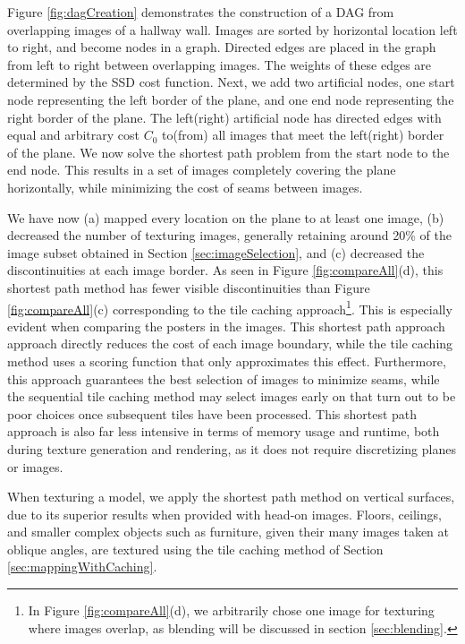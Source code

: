 \documentclass[]{spie}  %
\begin{document}
Figure \ref{fig:dagCreation} demonstrates the construction of a DAG
from overlapping images of a hallway wall. Images are sorted by
horizontal location left to right, and become nodes in a
graph. Directed edges are placed in the graph from left to right
between overlapping images. The weights of these edges are determined
by the SSD cost function. Next, we add two artificial nodes, one start
node representing the left border of the plane, and one end node
representing the right border of the plane. The left(right) artificial
node has directed edges with equal and arbitrary cost $C_0$ to(from)
all images that meet the left(right) border of the plane. We now solve
the shortest path problem from the start node to the end node. This
results in a set of images completely covering the plane horizontally,
while minimizing the cost of seams between images.

We have now (a) mapped every location on the plane to at least one
image, (b) decreased the number of texturing images, generally
retaining around 20\% of the image subset obtained in Section
\ref{sec:imageSelection}, and (c) decreased the discontinuities at
each image border. As seen in Figure \ref{fig:compareAll}(d), this
shortest path method has fewer visible discontinuities than Figure
\ref{fig:compareAll}(c) corresponding to the tile caching
approach\footnote{In Figure \ref{fig:compareAll}(d), we arbitrarily
  chose one image for texturing where images overlap, as blending will
  be discussed in section \ref{sec:blending}.}. This is especially
evident when comparing the posters in the images. This shortest path
approach approach directly reduces the cost of each image boundary,
while the tile caching method uses a scoring function that only
approximates this effect. Furthermore, this approach guarantees the
best selection of images to minimize seams, while the sequential tile
caching method may select images early on that turn out to be poor
choices once subsequent tiles have been processed. This shortest path
approach is also far less intensive in terms of memory usage and
runtime, both during texture generation and rendering, as it does not
require discretizing planes or images.

When texturing a model, we apply the shortest path method on vertical
surfaces, due to its superior results when provided with head-on
images. Floors, ceilings, and smaller complex objects such as
furniture, given their many images taken at oblique angles, are
textured using the tile caching method of Section
\ref{sec:mappingWithCaching}.
\end{document}
